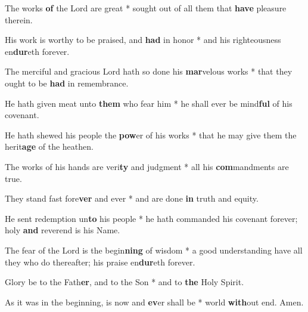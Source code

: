 \begin{multicols}{2}
	The works \textbf{of} the Lord are great * sought out of all them that \textbf{have} pleasure therein.
	
	His work is worthy to be praised, and \textbf{had} in honor * and his righteousness en\textbf{dur}eth forever.
	
	The merciful and gracious Lord hath so done his \textbf{mar}velous works * that they ought to be \textbf{had} in remembrance.
	
	He hath given meat unto \textbf{them} who fear him * he shall ever be mind\textbf{ful} of his covenant.
	
	He hath shewed his people the \textbf{pow}er of his works * that he may give them the herit\textbf{age} of the heathen.
	
	The works of his hands are veri\textbf{ty} and judgment * all his \textbf{com}mandments are true.
	
	They stand fast fore\textbf{ver} and ever * and are done \textbf{in} truth and equity.
	
	He sent redemption un\textbf{to} his people * he hath commanded his covenant forever; holy \textbf{and} reverend is his Name.
	
	The fear of the Lord is the begin\textbf{ning} of wisdom * a good understanding have all they who do thereafter; his praise en\textbf{dur}eth forever.
	
	Glory be to the Fath\textbf{er}, and to the Son * and to \textbf{the} Holy Spirit.
	
	As it was in the beginning, is now and \textbf{ev}er shall be * world \textbf{with}out end. Amen.
\end{multicols}